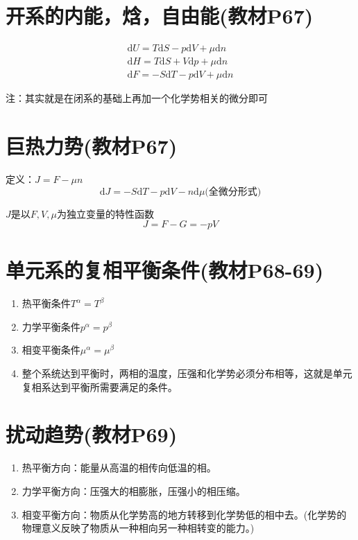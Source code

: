 \documentclass[oneside]{ctexbook}
\begin{document}
\section{开系的内能，焓，自由能(教材P67)}
\begin{gather*}
    \mathrm{d}U=T\mathrm{d}S-p\mathrm{d}V+\mu\mathrm{d}n\\
    \mathrm{d}H=T\mathrm{d}S+V\mathrm{d}p+\mu\mathrm{d}n\\
    \mathrm{d}F=-S\mathrm{d}T-p\mathrm{d}V+\mu\mathrm{d}n
\end{gather*}

注：其实就是在闭系的基础上再加一个化学势相关的微分即可

\section{巨热力势(教材P67)}

定义：\(J=F-\mu{}n\)
\begin{equation}
\mathrm{d}J=-S\mathrm{d}T-p\mathrm{d}V-n\mathrm{d}\mu\text{(全微分形式)}
\end{equation}

\(J\)是以\(F,V,\mu\)为独立变量的特性函数
\begin{equation}
J=F-G=-pV
\end{equation}

\section{单元系的复相平衡条件(教材P68-69)}
\begin{enumerate}
    \item 热平衡条件\(T^\alpha=T^\beta\)
    \item 力学平衡条件\(p^\alpha=p^\beta\)
    \item 相变平衡条件\(\mu^\alpha=\mu^\beta\)
    \item 整个系统达到平衡时，两相的温度，压强和化学势必须分布相等，这就是单元复相系达到平衡所需要满足的条件。
\end{enumerate}

\section{扰动趋势(教材P69)}
\begin{enumerate}
    \item 热平衡方向：能量从高温的相传向低温的相。
    \item 力学平衡方向：压强大的相膨胀，压强小的相压缩。
    \item 相变平衡方向：物质从化学势高的地方转移到化学势低的相中去。(化学势的物理意义反映了物质从一种相向另一种相转变的能力。)
\end{enumerate}
\end{document}
